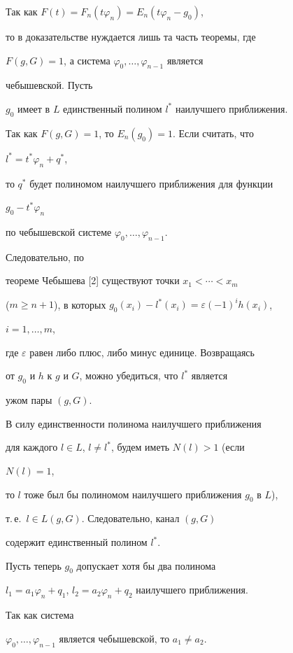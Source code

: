 \begin{pf} Так как $F(t)=F_n(t\varphi_n)=E_n(t\varphi_n-g_0)$, 


то в доказательстве нуждается лишь та часть теоремы, где 


$F(g,G)=1$, а система $\varphi_0,\dotsc,\varphi_{n-1}$ является 


чебышевской. Пусть 


$g_0$ имеет в $L$ единственный полином $l^*$ наилучшего приближения. 


Так как $F(g,G)=1$, то $E_n(g_0)=1$. Если считать, что 


$l^*=t^*\varphi_n+q^*$, 


то $q^*$ будет полиномом наилучшего приближения для функции 


$g_0-t^*\varphi_n$ 


по чебышевской системе $\varphi_0,\dotsc,\varphi_{n-1}$. 


Следовательно, по 


теореме Чебышева [2] существуют точки $x_1<\dotsb<x_m$ 


($m\ge n+1$), в которых $g_0(x_i)-l^*(x_i)=\varepsilon(-1)^i h(x_i)$, 


$i=1,\dotsc,m$, 


где $\varepsilon$ равен либо плюс, либо минус единице. Возвращаясь 


от $g_0$ и $h$ к $g$ и $G$, можно убедиться, что $l^*$ является 


ужом пары $(g,G)$. 


 


В силу единственности полинома наилучшего приближения 


для каждого $l\in L$, $l\ne l^*$, будем иметь $N(l)>1$ (если 


$N(l)=1$, 


то $l$ тоже был бы полиномом наилучшего приближения $g_0$ в $L$), 


т.\,е.~$l\in L(g,G)$. Следовательно, канал $(g,G)$ 


содержит единственный полином $l^*$. 


 


Пусть теперь $g_0$ допускает хотя бы два полинома 


$l_1=a_1\varphi_n+q_1$, $l_2=a_2\varphi_n+q_2$ наилучшего приближения. 


Так как система 


$\varphi_0,\dotsc,\varphi_{n-1}$ является чебышевской, то $a_1\ne a_2$. 



\end{pf}
